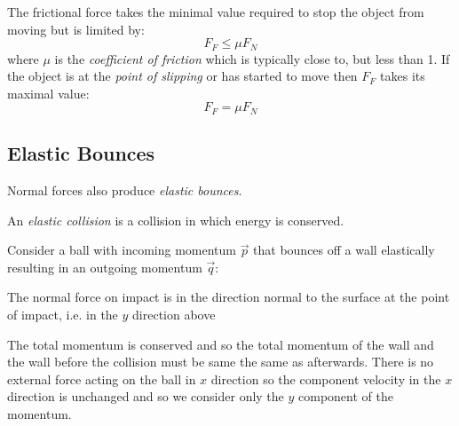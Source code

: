 \documentclass[../main.tex]{subfiles}
\begin{document}
The frictional force takes the minimal value required to stop the object from moving but is limited by:
\[
  F_{F} \leq \mu F_N
\]
where $\mu$ is the \textit{coefficient of friction} which is typically close to, but less than 1.
If the object is at the \textit{point of slipping} or has started to move then $F_F$ takes its maximal value:
\[
  F_{F} = \mu F_N
\]
\subsection{Elastic Bounces}
Normal forces also produce \textit{elastic bounces}.
\begin{definition}
  An \textit{elastic collision} is a collision in which energy is conserved.
\end{definition}
Consider a ball with incoming momentum $\vec{p}$ that bounces off a wall elastically resulting in an outgoing momentum $\vec{q}$:
\begin{center}
\end{center}
The normal force on impact is in the direction normal to the surface at the point of impact, i.e. in the $y$ direction above

The total momentum is conserved and so the total momentum of the wall and the wall before the collision must be same the same as afterwards.
There is no external force acting on the ball in $x$ direction so the component velocity in the $x$ direction is unchanged and so we consider only the $y$ component of the momentum.
\end{document}
